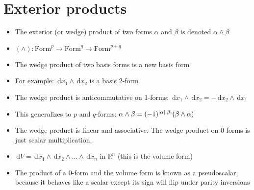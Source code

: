 \documentclass[a4paper,11pt]{report}
\newcommand{\real}{\ensuremath{\mathbb{R}}}
\newcommand{\diff}{\ensuremath{\, \mathrm{d}}}
\DeclarePairedDelimiter{\abs}{\lvert}{\rvert}
\begin{document}
\section{Exterior products}
\begin{itemize} \itemsep -2pt
    \item The exterior (or wedge) product of two forms $\alpha$ and $\beta$ is denoted $\alpha \wedge \beta$
    \item $(\wedge) : \mathrm{Form}^p \to \mathrm{Form}^q \to \mathrm{Form}^{p + q}$
    \item The wedge product of two basis forms is a new basis form
    \item For example: $\diff x_1 \wedge \diff x_2$ is a basis 2-form
    \item The wedge product is anticommutative on 1-forms: $\diff x_1 \wedge \diff x_2 = -\diff x_2 \wedge \diff x_1$
    \item This generalizes to $p$ and $q$-forms: $\alpha \wedge \beta = (-1)^{\abs{\alpha} \abs{\beta}} (\beta \wedge \alpha)$
    \item The wedge product is linear and associative. The wedge product on 0-forms is just scalar multiplication.
    \item $\diff V = \diff x_1 \wedge \diff x_2 \wedge \dots \wedge \diff x_n$ in $\real^n$ (this is the volume form)
    \item The product of a 0-form and the volume form is known as a pseudoscalar, because it behaves like a scalar except its sign will flip under parity inversions
\end{itemize}
\end{document}

